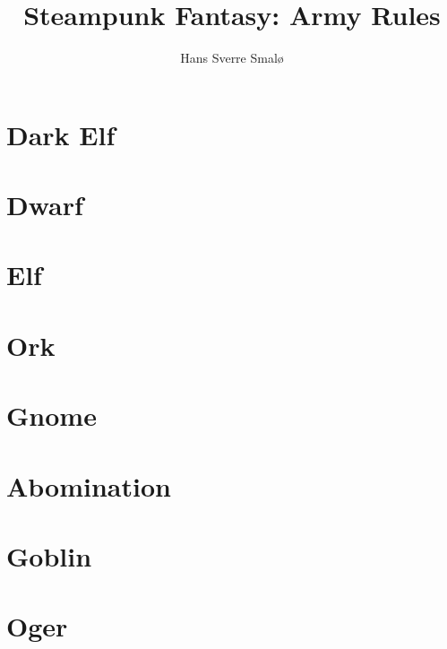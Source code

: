 \documentclass[a4,12pt, color, hyperref]{book}
\title{Steampunk Fantasy: Army Rules}
\author{Hans Sverre Smalø}
\begin{document}
\maketitle
\tableofcontents

\chapter{Dark Elf}


\chapter{Dwarf}


\chapter{Elf}


\chapter{Ork}



\chapter{Gnome}


\chapter{Abomination}



\chapter{Goblin}



\chapter{Oger}

\end{document}
